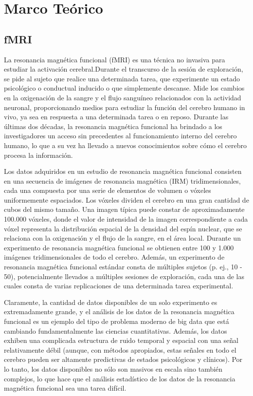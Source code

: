 \chapter{Marco Te\'orico}\label{chapter:theory}

\section{fMRI}

La resonancia magnética funcional (fMRI) es una técnica no invasiva para estudiar la activación cerebral.Durante el transcurso de la sesión de exploración, se pide al sujeto que realice una determinada tarea, que experimente un estado psicológico o conductual inducido o que simplemente descanse. Mide los cambios en la oxigenación de la sangre y el flujo sanguíneo relacionados con la actividad neuronal, proporcionando medios para estudiar la función del cerebro humano in vivo, ya sea en respuesta a una determinada tarea o en reposo. Durante las últimas dos décadas, la resonancia magnética funcional ha brindado a los investigadores un acceso sin precedentes al funcionamiento interno del cerebro humano, lo que a su vez ha llevado a nuevos conocimientos sobre cómo el cerebro procesa la información.

Los datos adquiridos en un estudio de resonancia magnética funcional consisten en una secuencia de imágenes de resonancia magnética (IRM) tridimensionales, cada una compuesta por una serie de elementos de volumen o vóxeles uniformemente espaciados. Los vóxeles dividen el cerebro en una gran cantidad de cubos del mismo tamaño. Una imagen típica puede constar de aproximadamente 100.000 vóxeles, donde el valor de intensidad de la imagen correspondiente a cada vóxel representa la distribución espacial de la densidad del espín nuclear, que se relaciona con la oxigenación y el flujo de la sangre, en el área local. Durante un experimento de resonancia magnética funcional se obtienen entre 100 y 1.000 imágenes tridimensionales de todo el cerebro. Además, un experimento de resonancia magnética funcional estándar consta de múltiples sujetos (p. ej., 10 - 50), potencialmente llevados a múltiples sesiones de exploración, cada una de las cuales consta de varias replicaciones de una determinada tarea experimental.

Claramente, la cantidad de datos disponibles de un solo experimento es extremadamente grande, y el análisis de los datos de la resonancia magnética funcional es un ejemplo del tipo de problema moderno de big data que está cambiando fundamentalmente las ciencias cuantitativas. Además, los datos exhiben una complicada estructura de ruido temporal y espacial con una señal relativamente débil (aunque, con métodos apropiados, estas señales en todo el cerebro pueden ser altamente predictivas de estados psicológicos y clínicos). Por lo tanto, los datos disponibles no sólo son masivos en escala sino también complejos, lo que hace que el análisis estadístico de los datos de la resonancia magnética funcional sea una tarea difícil.


